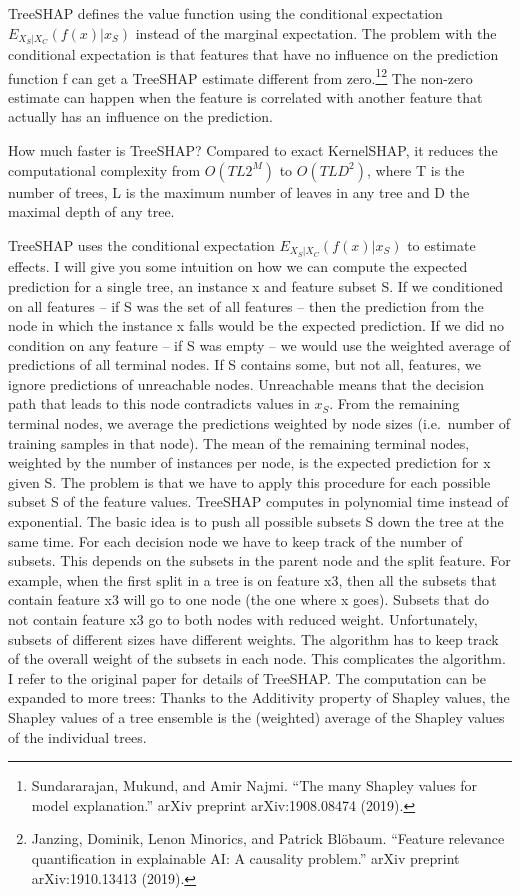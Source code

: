 \documentclass[12pt,]{krantz}
\begin{document}
TreeSHAP defines the value function using the conditional expectation
\(E_{X_S|X_C}(f(x)|x_S)\) instead of the marginal expectation. The
problem with the conditional expectation is that features that have no
influence on the prediction function f can get a TreeSHAP estimate
different from zero.\footnote{Sundararajan, Mukund, and Amir Najmi.
  ``The many Shapley values for model explanation.'' arXiv preprint
  arXiv:1908.08474 (2019).}\footnote{Janzing, Dominik, Lenon Minorics,
  and Patrick Blöbaum. ``Feature relevance quantification in explainable
  AI: A causality problem.'' arXiv preprint arXiv:1910.13413 (2019).}
The non-zero estimate can happen when the feature is correlated with
another feature that actually has an influence on the prediction.

How much faster is TreeSHAP? Compared to exact KernelSHAP, it reduces
the computational complexity from \(O(TL2^M)\) to \(O(TLD^2)\), where T
is the number of trees, L is the maximum number of leaves in any tree
and D the maximal depth of any tree.

TreeSHAP uses the conditional expectation \(E_{X_S|X_C}(f(x)|x_S)\) to
estimate effects. I will give you some intuition on how we can compute
the expected prediction for a single tree, an instance x and feature
subset S. If we conditioned on all features -- if S was the set of all
features -- then the prediction from the node in which the instance x
falls would be the expected prediction. If we did no condition on any
feature -- if S was empty -- we would use the weighted average of
predictions of all terminal nodes. If S contains some, but not all,
features, we ignore predictions of unreachable nodes. Unreachable means
that the decision path that leads to this node contradicts values in
\(x_S\). From the remaining terminal nodes, we average the predictions
weighted by node sizes (i.e.~number of training samples in that node).
The mean of the remaining terminal nodes, weighted by the number of
instances per node, is the expected prediction for x given S. The
problem is that we have to apply this procedure for each possible subset
S of the feature values. TreeSHAP computes in polynomial time instead of
exponential. The basic idea is to push all possible subsets S down the
tree at the same time. For each decision node we have to keep track of
the number of subsets. This depends on the subsets in the parent node
and the split feature. For example, when the first split in a tree is on
feature x3, then all the subsets that contain feature x3 will go to one
node (the one where x goes). Subsets that do not contain feature x3 go
to both nodes with reduced weight. Unfortunately, subsets of different
sizes have different weights. The algorithm has to keep track of the
overall weight of the subsets in each node. This complicates the
algorithm. I refer to the original paper for details of TreeSHAP. The
computation can be expanded to more trees: Thanks to the Additivity
property of Shapley values, the Shapley values of a tree ensemble is the
(weighted) average of the Shapley values of the individual trees.
\end{document}
